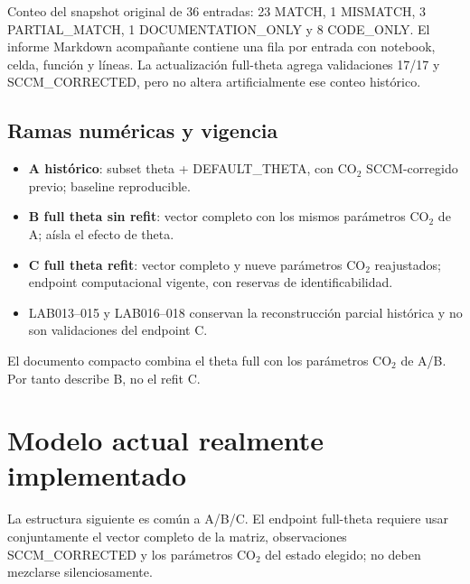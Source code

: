 \documentclass[11pt]{article}
\newcommand{\code}[1]{{\small\ttfamily #1}}
\begin{document}
Conteo del snapshot original de 36 entradas: 23 MATCH, 1 MISMATCH,
3 PARTIAL\_MATCH, 1 DOCUMENTATION\_ONLY y 8 CODE\_ONLY. El informe Markdown
acompañante contiene una fila por entrada con notebook, celda, función y líneas.
La actualización full-theta agrega validaciones 17/17 y SCCM\_CORRECTED, pero no
altera artificialmente ese conteo histórico.

\subsection{Ramas numéricas y vigencia}

\begin{itemize}
\item \textbf{A histórico}: subset theta + \code{DEFAULT\_THETA}, con CO$_2$
SCCM-corregido previo; baseline reproducible.
\item \textbf{B full theta sin refit}: vector completo con los mismos parámetros
CO$_2$ de A; aísla el efecto de theta.
\item \textbf{C full theta refit}: vector completo y nueve parámetros CO$_2$
reajustados; endpoint computacional vigente, con reservas de identificabilidad.
\item LAB013--015 y LAB016--018 conservan la reconstrucción parcial histórica y
no son validaciones del endpoint C.
\end{itemize}

El documento compacto  combina el theta full
con los parámetros CO$_2$ de A/B. Por tanto describe B, no el refit C.

\section{Modelo actual realmente implementado}

La estructura siguiente es común a A/B/C. El endpoint full-theta requiere usar
conjuntamente el vector completo de la matriz, observaciones SCCM\_CORRECTED y
los parámetros CO$_2$ del estado elegido; no deben mezclarse silenciosamente.
\end{document}
